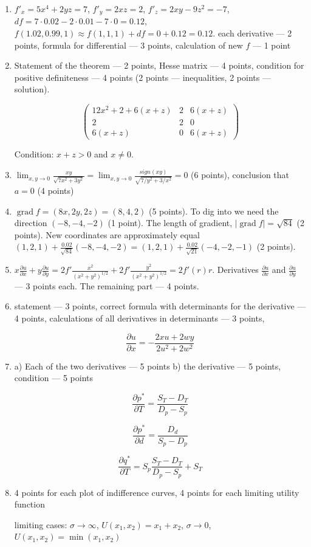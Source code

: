 \documentclass[12pt]{article} %
\theoremstyle{definition} %
\DeclareMathOperator{\grad}{grad}
\providecommand{\grad}{\mathrm{grad}\,}
\begin{document}
\begin{enumerate}
\item $f'_x=5x^4+2yz=7$, $f'_y=2xz=2$, $f'_z=2xy-9z^2=-7$, $df=7\cdot 0.02-2\cdot 0.01-7\cdot 0=0.12$, $f(1.02,0.99,1)\approx f(1,1,1)+df=0+0.12=0.12$.
each derivative --- 2 points, formula for differential --- 3 points, calculation of new $f$ --- 1 point

\item  Statement of the theorem --- 2 points, Hesse matrix --- 4 points, condition for positive definiteness --- 4 points (2 points --- inequalities, 2 points --- solution).

\[
\begin{pmatrix}
12x^2+2+6(x+z) & 2 & 6(x+z) \\
2 & 2 & 0 \\
6(x+z) & 0 & 6(x+z)
\end{pmatrix}
\]

Condition: $x+z>0$ and $x\neq 0$.


\item $\lim_{x,y\to 0} \frac{xy}{\sqrt{7x^2+3y^2}}=\lim_{x,y\to 0} \frac{sign(xy)}{\sqrt{7/y^2+3/x^2}}=0$ (6 points), conclusion that $a=0$ (4 points)
\item $\grad f=(8x, 2y, 2z)=(8, 4, 2)$ (5 points). To dig into we need the direction $(-8, -4,-2)$ (1 point). The length of gradient, $|\grad f| = \sqrt{84}$ (2 points). New coordinates are approximately equal $(1,2,1)+\frac{0.02}{\sqrt{84}}(-8,-4,-2)=(1,2,1)+\frac{0.02}{\sqrt{21}}(-4,-2,-1)$ (2 points).

\item $x\frac{\partial u}{\partial x}+y\frac{\partial u}{\partial y}=2f'\frac{x^2}{(x^2+y^2)^{1/2}}+2f'\frac{y^2}{(x^2+y^2)^{1/2}}=2f'(r)r$. Derivatives $\frac{\partial u}{\partial x}$ and $\frac{\partial u}{\partial y}$ --- 3 points each. The remaining part --- 4 points.

\item statement --- 3 points, correct formula with determinants for the derivative --- 4 points, calculations of all derivatives in determinants --- 3 points,

\[
\frac{\partial u}{\partial x}=- \frac{2xu+2wy}{2u^2+2w^2}
\]

\item a) Each of the two derivatives --- 5 points b) the derivative --- 5 points, condition --- 5 points

\[
\frac{\partial p^*}{\partial T}=\frac{S_T-D_T}{D_p-S_p}
\]

\[
\frac{\partial p^*}{\partial d}=\frac{D_d}{S_p-D_p}
\]

\[
\frac{\partial q^*}{\partial T}=S_p\frac{S_T-D_T}{D_p-S_p}+S_T
\]

\item 4 points for each plot of indifference curves, 4 points for each limiting utility function

limiting cases: $\sigma\to\infty$, $U(x_1,x_2)=x_1+x_2$, $\sigma\to 0$, $U(x_1,x_2)=\min(x_1,x_2)$


\end{enumerate}
\end{document}
